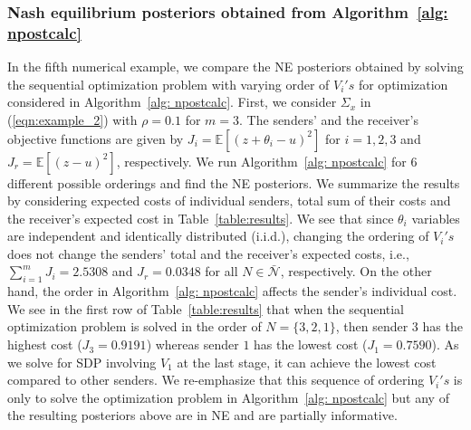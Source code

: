 \documentclass[12pt,journal,onecolumn]{IEEEtran}
\newcommand{\rknote}[1]{\noindent{\leavevmode\color{red}[Raj -- #1]}}
\begin{document}
\subsubsection{Nash equilibrium posteriors obtained from Algorithm~\ref{alg: npostcalc}}
In the fifth numerical example, we compare the NE posteriors obtained by solving the sequential optimization problem with varying order of $V_i's$ for optimization considered in Algorithm~\ref{alg: npostcalc}. First, we consider $\Sigma_x$ in (\ref{eqn:example_2}) with $\rho = 0.1$ for $m=3$. The senders' and the receiver's objective functions are given by $J_{i} =\mathbb{E}[({z}+{\theta_i}-u)^2]$ for $i =1,2, 3$ and $J_{r} =\mathbb{E}[({z}-u)^2]$, respectively. We run Algorithm~\ref{alg: npostcalc} for $6$ different possible orderings and find the NE posteriors. We summarize the results by considering expected costs of individual senders, total sum of their costs and the receiver's expected cost in Table~\ref{table:results}. We see that since $\theta_i$ variables are independent and identically distributed (i.i.d.), changing the ordering of $V_i's$ does not change the senders' total and the receiver's expected costs, i.e., $\sum_{i=1}^m J_{i} = 2.5308$ and $J_r = 0.0348$ for all $N\in\bar{\mathcal{N}}$, respectively. On the other hand, the order in Algorithm~\ref{alg: npostcalc} affects the sender's individual cost. We see in the first row of Table~\ref{table:results} that when the sequential optimization problem is solved in the order of $N= \{3,2,1\}$, then sender $3$ has the highest cost ($J_{3} = 0.9191$) whereas sender $1$ has the lowest cost ($J_{1} = 0.7590$). As we solve for SDP involving $V_1$ at the last stage, %
it can achieve the lowest cost compared to other senders. We re-emphasize that this sequence of ordering $V_i's$ is only to solve the optimization problem in Algorithm~\ref{alg: npostcalc} but any of the resulting posteriors above are in NE and are partially informative.
\end{document}
